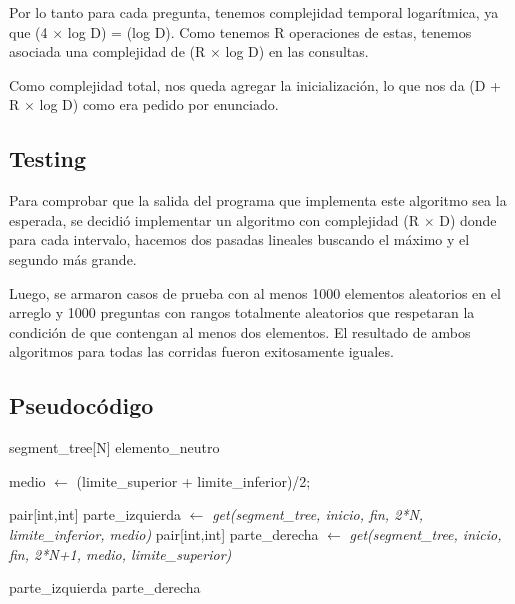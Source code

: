 Por lo tanto para cada pregunta, tenemos complejidad temporal logarítmica, ya que \bigo(4 $\times$ log D) = \bigo(log D).
Como tenemos R operaciones de estas, tenemos asociada una complejidad  de \bigo(R $\times$ log D) en las consultas. \newline 

Como complejidad total, nos queda agregar la inicialización, lo que nos da \bigo(D + R $\times$ log D) como era pedido por enunciado.

\subsection{Testing}

Para comprobar que la salida del programa que implementa este algoritmo sea la esperada, se decidió implementar un algoritmo con complejidad \bigo(R $\times$ D) donde para cada intervalo, hacemos dos pasadas lineales buscando el máximo y el segundo más grande. \newline

Luego, se armaron casos de prueba con al menos 1000 elementos aleatorios en el arreglo y 1000 preguntas con rangos totalmente aleatorios que respetaran la condición de que contengan al menos dos elementos. El resultado de ambos algoritmos para todas las corridas fueron exitosamente iguales.

\subsection{Pseudocódigo}


\begin{algorithmic}
	 
		\State \Return segment_tree[N]
	\EndIf
	 
		\State \Return elemento_neutro
	\EndIf


	\State medio $\gets$ (limite_superior + limite_inferior)/2;
	
	\State pair[int,int] parte_izquierda $\gets$ \textit{get(segment_tree, inicio, fin, 2*N, limite_inferior, medio)}
	\State pair[int,int] parte_derecha $\gets$ \textit{get(segment_tree, inicio, fin, 2*N+1, medio, limite_superior)}
	
		\State \Return parte_izquierda
	\Else
		\State \Return parte_derecha
	\EndIf


\EndFunction
\end{algorithmic}
\hspace{.5cm}



